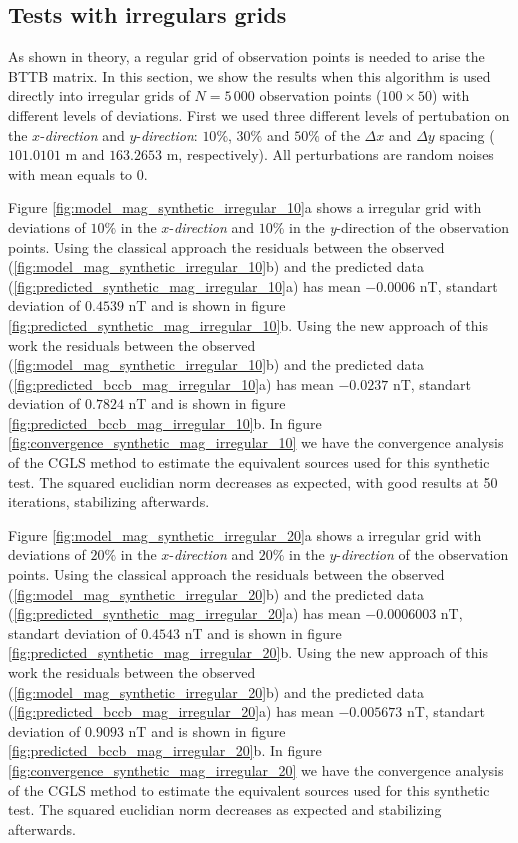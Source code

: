 \subsection*{Tests with irregulars grids}

As shown in theory, a regular grid of observation points is needed to arise the BTTB matrix. In this section, we show the results when this algorithm is used directly into irregular grids of $N = 5 \, 000$ observation points ($100 \times 50$) with different levels of deviations. First we used three different levels of pertubation on the $x$-\textit{direction} and $y$-\textit{direction}: $10\%$, $30\%$ and $50\%$ of the $\Delta x$ and $\Delta y$ spacing ($101.0101$ m and $163.2653$ m, respectively). All perturbations are random noises with mean equals to $0$.

Figure \ref{fig:model_mag_synthetic_irregular_10}a shows a irregular grid with deviations of $10\%$ in the $x$-\textit{direction} and $10\%$ in the \emph{y}-direction of the observation points. Using the classical approach the residuals between the observed (\ref{fig:model_mag_synthetic_irregular_10}b) and the predicted data (\ref{fig:predicted_synthetic_mag_irregular_10}a) has mean $-0.0006$ nT, standart deviation of $0.4539$ nT and is shown in figure \ref{fig:predicted_synthetic_mag_irregular_10}b. Using the new approach of this work the residuals between the observed (\ref{fig:model_mag_synthetic_irregular_10}b) and the predicted data (\ref{fig:predicted_bccb_mag_irregular_10}a) has mean $-0.0237$ nT, standart deviation of $0.7824$ nT and is shown in figure \ref{fig:predicted_bccb_mag_irregular_10}b.
In figure \ref{fig:convergence_synthetic_mag_irregular_10} we have the convergence analysis of the CGLS method to estimate the equivalent sources used for this synthetic test. The squared euclidian norm decreases as expected, with good results at 50 iterations, stabilizing afterwards.

Figure \ref{fig:model_mag_synthetic_irregular_20}a shows a irregular grid with deviations of $20\%$ in the $x$-\textit{direction} and $20\%$ in the $y$-\textit{direction} of the observation points. Using the classical approach the residuals between the observed (\ref{fig:model_mag_synthetic_irregular_20}b) and the predicted data (\ref{fig:predicted_synthetic_mag_irregular_20}a) has mean $-0.0006003$ nT, standart deviation of $0.4543$ nT and is shown in figure \ref{fig:predicted_synthetic_mag_irregular_20}b. Using the new approach of this work the residuals between the observed (\ref{fig:model_mag_synthetic_irregular_20}b) and the predicted data (\ref{fig:predicted_bccb_mag_irregular_20}a) has mean $-0.005673$ nT, standart deviation of $0.9093$ nT and is shown in figure \ref{fig:predicted_bccb_mag_irregular_20}b.
In figure \ref{fig:convergence_synthetic_mag_irregular_20} we have the convergence analysis of the CGLS method to estimate the equivalent sources used for this synthetic test. The squared euclidian norm decreases as expected and stabilizing afterwards.

